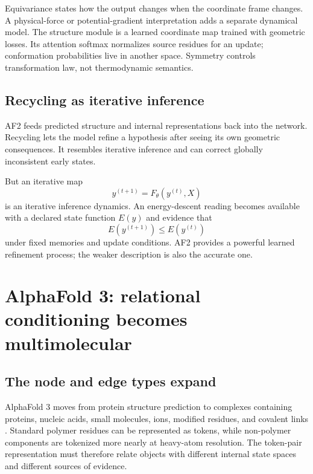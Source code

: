 Equivariance states how the output changes when the coordinate frame changes.  A physical-force or
potential-gradient interpretation adds a separate dynamical model.  The structure module is a
learned coordinate map trained with geometric losses.  Its attention softmax normalizes source
residues for an update; conformation probabilities live in another space.
Symmetry controls transformation law, not thermodynamic semantics.

\subsection{Recycling as iterative inference}

AF2 feeds predicted structure and internal representations back into the network.  Recycling lets
the model refine a hypothesis after seeing its own geometric consequences.  It resembles iterative
inference and can correct globally inconsistent early states.

But an iterative map
\begin{equation}
y^{(t+1)}=F_\theta(y^{(t)},X)
\end{equation}
is an iterative inference dynamics.  An energy-descent reading becomes available with a declared
state function $E(y)$ and evidence that
\begin{equation}
E(y^{(t+1)})\leq E(y^{(t)})
\end{equation}
under fixed memories and update conditions.  AF2 provides a powerful learned refinement process;
the weaker description is also the accurate one.

\section{AlphaFold 3: relational conditioning becomes multimolecular}

\subsection{The node and edge types expand}

AlphaFold 3 moves from protein structure prediction to complexes containing proteins, nucleic
acids, small molecules, ions, modified residues, and covalent links \cite{abramson2024}.  Standard
polymer residues can be represented as tokens, while non-polymer components are tokenized more
nearly at heavy-atom resolution.  The token-pair representation must therefore relate objects with
different internal state spaces and different sources of evidence.

